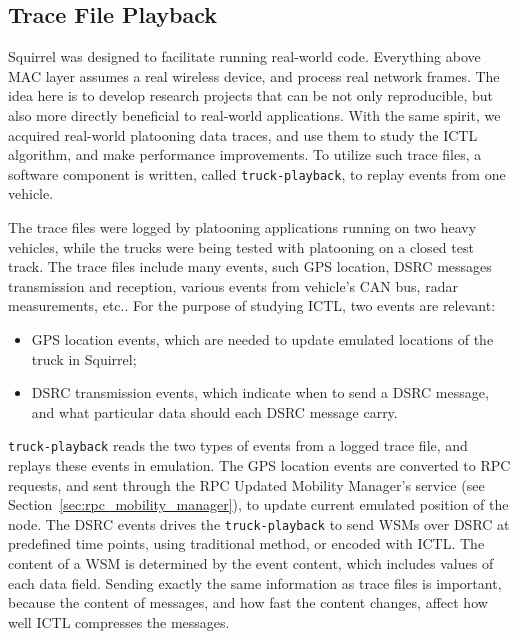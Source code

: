 \documentclass[12pt]{report}
\begin{document}
\subsection{Trace File Playback}
\label{sec:truck_playback}

Squirrel was designed to facilitate running real-world code. Everything above MAC layer assumes a real wireless device, and process real network frames. The idea here is to develop research projects that can be not only reproducible, but also more directly beneficial to real-world applications. With the same spirit, we acquired real-world platooning data traces, and use them to study the ICTL algorithm, and make performance improvements. To utilize such trace files, a software component is written, called \texttt{truck-playback}, to replay events from one vehicle.

The trace files were logged by platooning applications running on two heavy vehicles, while the trucks were being tested with platooning on a closed test track. The trace files include many events, such GPS location, DSRC messages transmission and reception, various events from vehicle's CAN bus, radar measurements, etc.. For the purpose of studying ICTL, two events are relevant:

\begin{itemize}
  \item GPS location events, which are needed to update emulated locations of the truck in Squirrel;
  \item DSRC transmission events, which indicate when to send a DSRC message, and what particular data should each DSRC message carry.
\end{itemize}

\texttt{truck-playback} reads the two types of events from a logged trace file, and replays these events in emulation. The GPS location events are converted to RPC requests, and sent through the RPC Updated Mobility Manager's service (see Section~\ref{sec:rpc_mobility_manager}), to update current emulated position of the node. The DSRC events drives the \texttt{truck-playback} to send WSMs over DSRC at predefined time points, using traditional method, or encoded with ICTL. The content of a WSM is determined by the event content, which includes values of each data field. Sending exactly the same information as trace files is important, because the content of messages, and how fast the content changes, affect how well ICTL compresses the messages.
\end{document}
